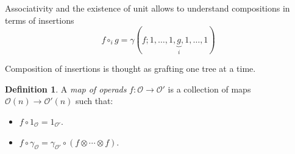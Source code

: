 \documentclass{beamer}
\theoremstyle{definition}
\newtheorem{defi}{Definition}
\begin{document}
\begin{frame}
	Associativity and the existence of unit allows to understand compositions in terms of insertions $$f\circ_i g=\gamma(f;1,\dots, 1,\underbrace{g}_{i},1,\dots, 1)$$ \pause
	
	Composition of insertions is thought as grafting one tree at a time.
\end{frame}
\begin{frame}
	\begin{defi}
	 A \emph{map of operads} $f:\mathcal{O}\to \mathcal{O}'$ is a collection of maps $\mathcal{O}(n)\to \mathcal{O}'(n)$ such that:
		\begin{itemize}
			\item<1->   $f\circ 1_\mathcal{O}=1_{\mathcal{O}'}$.
			\item<2->  $f\circ \gamma_\mathcal{O}=\gamma_{\mathcal{O}'}\circ (f\otimes\cdots\otimes f)$.
		\end{itemize}
	\end{defi}
	
	
\end{frame}
%	
\end{document}
